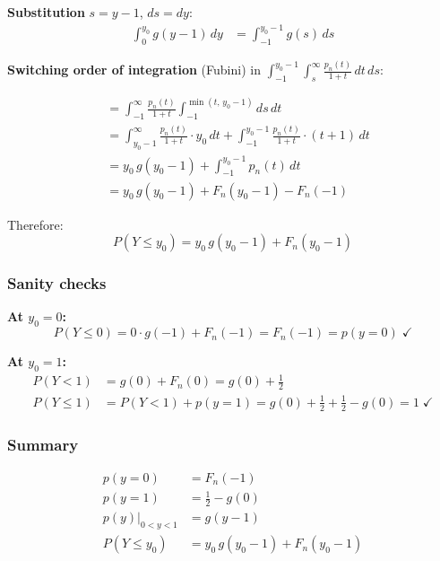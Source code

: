 \textbf{Substitution} $s = y-1$, $ds = dy$:
\begin{align*}
  \int_0^{y_0} g(y-1)\,dy
    &= \int_{-1}^{y_0-1} g(s)\,ds
\end{align*}

\textbf{Switching order of integration} (Fubini) in
$\int_{-1}^{y_0-1} \int_s^{\infty} \frac{p_n(t)}{1+t}\,dt\,ds$:

\begin{align*}
  &= \int_{-1}^{\infty} \frac{p_n(t)}{1+t}
     \int_{-1}^{\min(t,\,y_0-1)} ds\,dt \\[4pt]
  &= \int_{y_0-1}^{\infty} \frac{p_n(t)}{1+t}\cdot y_0\,dt
   + \int_{-1}^{y_0-1} \frac{p_n(t)}{1+t}\cdot(t+1)\,dt \\[4pt]
  &= y_0\,g(y_0-1)
   + \int_{-1}^{y_0-1} p_n(t)\,dt \\[4pt]
  &= y_0\,g(y_0-1) + F_n(y_0-1) - F_n(-1)
\end{align*}

Therefore:
\begin{equation}
  \boxed{P(Y \leq y_0)
    = y_0\,g(y_0 - 1) + F_n(y_0 - 1)}
  \label{eq:CDF_mult}
\end{equation}

\subsubsection*{Sanity checks}

\textbf{At $y_0 = 0$:}
\[
  P(Y \leq 0) = 0 \cdot g(-1) + F_n(-1) = F_n(-1) = p(y=0) \;\checkmark
\]

\textbf{At $y_0 = 1$:}
\begin{align*}
  P(Y < 1) &= g(0) + F_n(0) = g(0) + \tfrac{1}{2} \\
  P(Y \leq 1) &= P(Y < 1) + p(y=1)
               = g(0) + \tfrac{1}{2} + \tfrac{1}{2} - g(0) = 1 \;\checkmark
\end{align*}

\subsubsection*{Summary}

\[
\boxed{
\begin{aligned}
  p(y=0) &= F_n(-1) \\
  p(y=1) &= \tfrac{1}{2} - g(0) \\
  p(y)\big|_{0<y<1} &= g(y-1) \\
  P(Y \leq y_0) &= y_0\,g(y_0-1) + F_n(y_0-1)
\end{aligned}
}
\]

